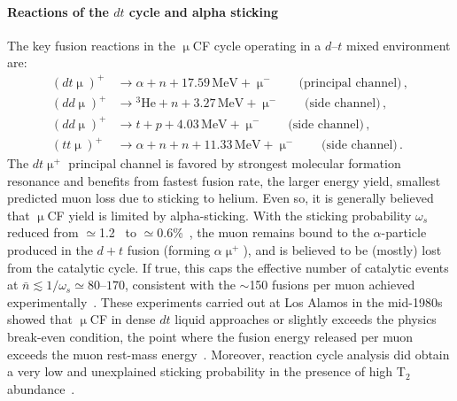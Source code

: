 \documentclass[particles,article,accept,pdftex,moreauthors]{Definitions/mdpi}
\begin{document}
\paragraph*{\bf Reactions of the $dt$ cycle and alpha sticking}
The key fusion reactions in the $\upmu$CF cycle operating in a $d$--$t$ mixed environment are:
\begin{align}
(dt\upmu)^+ &\to \alpha + n + 17.59\,\mathrm{MeV} + \upmu^- \qquad \text{(principal channel)}\,,\\
(dd\upmu)^+ &\to {}^3\mathrm{He} + n + 3.27\,\mathrm{MeV} + \upmu^- \qquad \text{(side channel)}\,,\\
(dd\upmu)^+ &\to t + p + 4.03\,\mathrm{MeV} + \upmu^- \qquad \text{(side channel)}\,,\\
(tt\upmu)^+ &\to \alpha + n + n + 11.33\,\mathrm{MeV} + \upmu^- \qquad \text{(side channel)}\,.
\end{align}
The $dt\upmu^+$ principal channel is favored by strongest molecular formation resonance and benefits from fastest fusion rate, the larger energy yield, smallest predicted muon loss due to sticking to helium. Even so, it is generally believed that $\upmu$CF yield is limited by alpha-sticking. With the sticking probability $\omega_s$ reduced from $\simeq$1.2~\cite{Jackson:1957zza} to $\simeq$0.6\%~\cite{jones1993evaluation,Rafelski:1988wq,Jones1997}, the muon remains bound to the $\alpha$-particle produced in the $d+t$ fusion (forming $\alpha\upmu^+$), and is believed to be (mostly) lost from the catalytic cycle. If true, this caps the effective number of catalytic events at $\bar{n}\lesssim 1/\omega_s\simeq 80$--$170$, consistent with the $\sim$150 fusions per muon achieved experimentally~\cite{Jones:1983pw,Jones:1986kk}. These experiments carried out at Los Alamos in the mid-1980s showed that $\upmu$CF in dense $dt$ liquid approaches or slightly exceeds the physics break-even condition, the point where the fusion energy released per muon exceeds the muon rest-mass energy~\cite{Rafelski:1990in}. Moreover, reaction cycle analysis did obtain a very low and unexplained sticking probability in the presence of high T$_2$ abundance~\cite{jones1993evaluation}.
\end{document}
